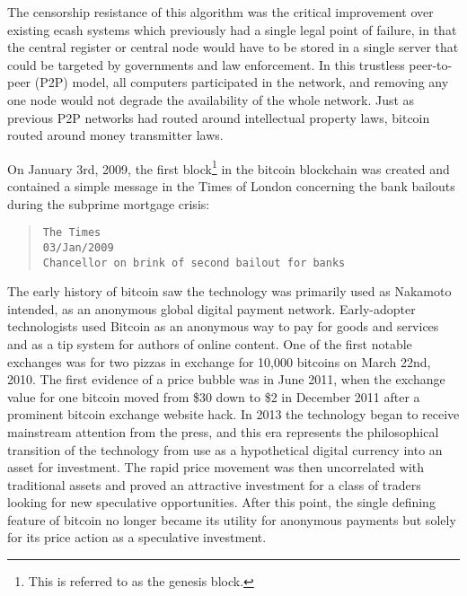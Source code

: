 The censorship resistance of this algorithm was the critical improvement over
existing ecash systems which previously had a single legal point of failure, in
that the central register or central node would have to be stored in a single
server that could be targeted by governments and law enforcement. In this
trustless peer-to-peer (P2P) model, all computers participated in the network,
and removing any one node would not degrade the availability of the whole
network. Just as previous P2P networks had routed around intellectual property
laws, bitcoin routed around money transmitter laws.

On January 3rd, 2009, the first block\footnote{This is referred to as the
genesis block.} in the bitcoin blockchain was created and contained a simple
message in the Times of London concerning the bank bailouts during the subprime
mortgage crisis:

\begin{quote}
\begin{verbatim}
The Times
03/Jan/2009
Chancellor on brink of second bailout for banks
\end{verbatim}
\end{quote}

The early history of bitcoin saw the technology was primarily used as Nakamoto
intended, as an anonymous global digital payment network. Early-adopter
technologists used Bitcoin as an anonymous way to pay for goods and services and
as a tip system for authors of online content. One of the first notable
exchanges was for two pizzas in exchange for 10,000 bitcoins on March 22nd,
2010. The first evidence of a price bubble was in June 2011, when the exchange
value for one bitcoin moved from \$30 down to \$2 in December 2011 after a
prominent bitcoin exchange website hack. In 2013 the technology began to receive
mainstream attention from the press, and this era represents the philosophical
transition of the technology from use as a hypothetical digital currency into an
asset for investment. The rapid price movement was then uncorrelated with
traditional assets and proved an attractive investment for a class of traders
looking for new speculative opportunities. After this point, the single defining
feature of bitcoin no longer became its utility for anonymous payments but
solely for its price action as a speculative investment.

